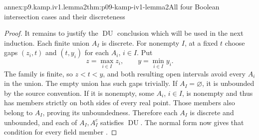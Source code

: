 \begin{annexitem}{annex:p9.kamp.iv1.lemma2}{thm:p09-kamp-iv1-lemma2}{All four Boolean intersection cases and their discreteness}
\begin{proof}
It remains to justify the \(\operatorname{DU}\) conclusion
which will be used in the next induction. Each finite union
\(A_I\) is discrete. For nonempty \(I\), at a fixed
\(t\) choose gaps \((z_i,t)\) and \((t,y_i)\) for each
\(A_i\), \(i\in I\). Put
\[
                     z=\max_{i\in I}z_i,
                 \qquad y=\min_{i\in I}y_i.
\]
The family is finite, so \(z<t<y\), and both resulting
open intervals avoid every \(A_i\) in the union. The empty
union has such gaps trivially. If \(A_I=\varnothing\), it
is unbounded by the source convention. If it is nonempty, some
\(A_i\), \(i\in I\), is nonempty and thus has members
strictly on both sides of every real point. Those members also
belong to \(A_I\), proving its unboundedness. Therefore each
\(A_I\) is discrete and unbounded, and each of
\(A_I,A_I^c\) satisfies \(\operatorname{DU}\). The normal
form now gives that condition for every field member
\cite[ch.~IV, lemma~2, pp.~97--98]{Kamp1968}.
\end{proof}
\end{annexitem}

